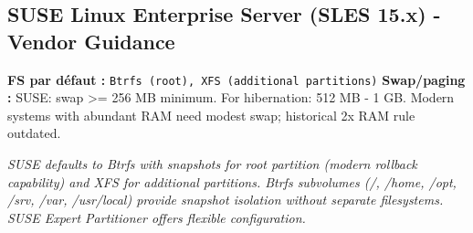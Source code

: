 \documentclass[10pt,a4paper]{article}
\begin{document}
\subsection{SUSE Linux Enterprise Server (SLES 15.x) - Vendor Guidance}
\noindent\small \textbf{FS par d\'efaut :} \texttt{Btrfs (root), XFS (additional partitions)} \quad\textbullet\quad \textbf{Swap/paging :} SUSE: swap >= 256 MB minimum. For hibernation: 512 MB - 1 GB. Modern systems with abundant RAM need modest swap; historical 2x RAM rule outdated.\normalsize\par\smallskip
\noindent\small\textit{SUSE defaults to Btrfs with snapshots for root partition (modern rollback capability) and XFS for additional partitions. Btrfs subvolumes (/, /home, /opt, /srv, /var, /usr/local) provide snapshot isolation without separate filesystems. SUSE Expert Partitioner offers flexible configuration.}\normalsize\par\smallskip
\end{document}

